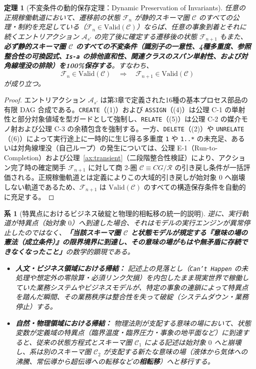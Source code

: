 \documentclass[11pt,a4paper]{ltjsarticle}
\theoremstyle{definition}
\theoremstyle{plain}
\newtheorem{theorem}{定理}[section]
\newtheorem{corollary}{系}[section]
\theoremstyle{remark}
\newcommand{\Valid}{\mathrm{Valid}}
\begin{document}
\begin{theorem}[不変条件の動的保存定理：Dynamic Preservation of Invariants]\label{thm:inv-pres}
任意の正規稼働軌道において、遷移前の状態 $\mathcal{F}_n$ が静的スキーマ圏 $\mathcal{C}$ のすべての公理・制約を充足している（$\mathcal{F}_n \in \Valid(\mathcal{C})$）ならば、任意の事象到着とそれに続くエントリアクション $\mathcal{A}_{s'}$ の完了後に確定する遷移後の状態 $\mathcal{F}_{n+1}$ もまた、\textbf{必ず静的スキーマ圏 $\mathcal{C}$ のすべての不変条件（識別子の一意性、4種多重度、参照整合性の可換図式、\texttt{Is-a} の排他直和性、関連クラスのスパン単射性、および対角線埋没の排除）を100\%保存する}。すなわち、
\begin{equation}
\mathcal{F}_n \in \Valid(\mathcal{C}) \quad \Longrightarrow \quad \mathcal{F}_{n+1} \in \Valid(\mathcal{C})
\end{equation}
が成り立つ。
\end{theorem}

\begin{proof}
エントリアクション $\mathcal{A}_{s'}$ は第3章で定義された16種の基本プロセス部品の有限 DAG 合成である。\texttt{CREATE}（(1)）および \texttt{ASSIGN}（(4)）は公理 C-1 の単射性と部分対象値域を型ガードとして強制し、\texttt{RELATE}（(5)）は公理 C-2 の媒介モノ射および公理 C-3 の余積包含を強制する。一方、\texttt{DELETE}（(2)）や \texttt{UNRELATE}（(6)）によって実行途上に一時的に生じ得る多重度 \texttt{1} や \texttt{1..*} の未充足、あるいは対角線埋没（自己ループ）の発生については、公理 E-1（Run-to-Completion）および公理~\ref{ax:transient}（二段階整合性検証）により、アクション完了時の確定関手 $\mathcal{F}_{n+1}$ に対して商 2-圏 $\mathcal{C} \equiv CG/\mathcal{R}$ の引き戻し条件が一括評価される。正規稼働軌道とは定義によりこの大域的引き戻しが始対象 $0$ へ崩壊しない軌道であるため、$\mathcal{F}_{n+1}$ は $\Valid(\mathcal{C})$ のすべての構造保存条件を自動的に充足する。
\end{proof}

\begin{corollary}[特異点におけるビジネス破綻と物理的相転移の統一的説明]\label{cor:singularities}
逆に、実行軌道が特異点（始対象 $0$）へ到達した場合、それはモデルの実行エンジンが異常停止したのではなく、\textbf{「当該スキーマ圏 $\mathcal{C}$ と状態モデルが規定する『意味の場の憲法（成立条件）』の限界境界に到達し、その意味の場がもはや無矛盾に存続できなくなったこと」}の数学的顕現である。
\begin{itemize}
    \item \textbf{人文・ビジネス領域における帰結：} 記述上の見落とし（\texttt{Can't Happen} の未処理や想定外の零除算・必須リンク欠損）を内包したまま現実世界で稼働していた業務システムやビジネスモデルが、特定の事象の連鎖によって特異点を踏んだ瞬間、その業務秩序は整合性を失って破綻（システムダウン・業務停止）する。
    \item \textbf{自然・物理領域における帰結：} 物理法則が支配する意味の場において、状態変数が定義域の特異点（臨界温度・臨界圧力・事象の地平面など）に到達すると、従来の状態方程式とスキーマ圏 $\mathcal{C}_1$ による記述は始対象 $0$ へと崩壊し、系は別のスキーマ圏 $\mathcal{C}_2$ が支配する新たな意味の場（液体から気体への沸騰、常伝導から超伝導への転移などの\textbf{相転移}）へと移行する。
\end{itemize}
\end{corollary}
\end{document}
